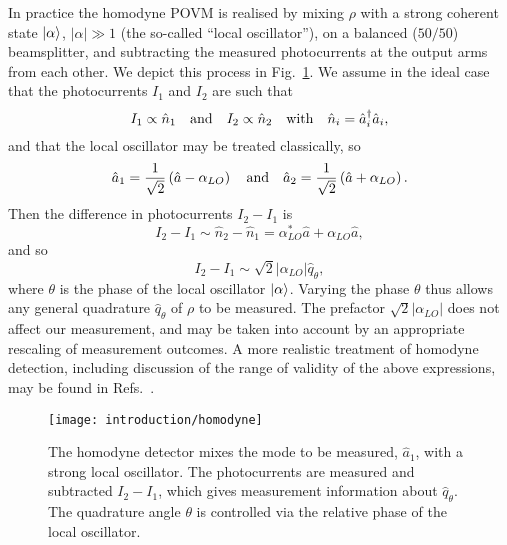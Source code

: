 In practice the homodyne POVM is realised by mixing $\rho$ with a strong coherent state $\ket{\alpha}$, $\left|\alpha\right| \gg 1$ (the so-called ``local oscillator''), on a balanced ($50/50$) beamsplitter, and subtracting the measured photocurrents at the output arms from each other. We depict this process in Fig.~\ref{fig:intro_homodyne}. We assume in the ideal case that the photocurrents $I_1$ and $I_2$ are such that
\begin{equation}
I_1 \propto \hat{n}_1 \qq{and} I_2 \propto \hat{n}_2 \qq{with} \hat{n}_i = \hat{a}_i^\dagger \hat{a}_i,
\end{equation}
and that the local oscillator may be treated classically, so
\begin{equation}
\hat{a}_1 = \frac{1}{\sqrt{2}} \left(\hat{a} - \alpha_{LO}\right) \qq{and} \hat{a}_2 = \frac{1}{\sqrt{2}}\left(\hat{a} + \alpha_{LO}\right).
\end{equation}
Then the difference in photocurrents $I_2 - I_1$ is
\begin{equation}
I_2 - I_1 \sim \hat{n}_2 - \hat{n}_1 = \alpha_{LO}^* \hat{a} + \alpha_{LO}\hat{a},
\end{equation}
and so
\begin{equation}
I_2 - I_1 \sim \sqrt{2} \left|\alpha_{LO}\right| \hat{q}_\theta,
\end{equation}
where $\theta$ is the phase of the local oscillator $\ket{\alpha}$. Varying the phase $\theta$ thus allows any general quadrature $\hat{q}_\theta$ of $\rho$ to be measured. The prefactor $\sqrt{2}\left|\alpha_{LO}\right|$ does not affect our measurement, and may be taken into account by an appropriate rescaling of measurement outcomes. A more realistic treatment of homodyne detection, including discussion of the range of validity of the above expressions, may be found in Refs.~\cite{Leonhardt1998, Serafini2017}.


\begin{figure}[htp]
\centering
\captionsetup{width=0.8\linewidth}
\texttt{[image: introduction/homodyne]}
\caption{\label{fig:intro_homodyne} The homodyne detector mixes the mode to be measured, $\hat{a}_1$, with a strong local oscillator. The photocurrents are measured and subtracted $I_2 - I_1$, which gives measurement information about $\hat{q}_\theta$. The quadrature angle $\theta$ is controlled via the relative phase of the local oscillator.}
\end{figure}



